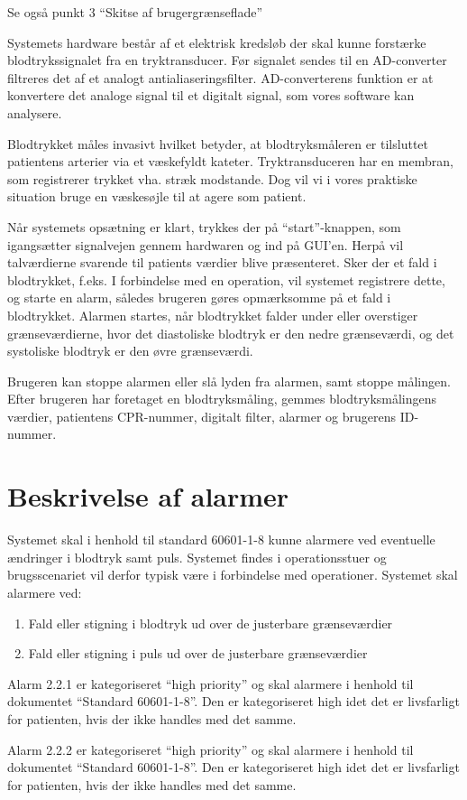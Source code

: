 \vspace{0.7 cm}
Se også punkt 3 “Skitse af brugergrænseflade”


Systemets hardware består af et elektrisk kredsløb der skal kunne forstærke blodtrykssignalet fra en tryktransducer. Før signalet sendes til en AD-converter filtreres det af et analogt antialiaseringsfilter. AD-converterens funktion er at konvertere det analoge signal til et digitalt signal, som vores software kan analysere.

Blodtrykket måles invasivt hvilket betyder, at blodtryksmåleren er tilsluttet patientens arterier via et væskefyldt kateter. Tryktransduceren har en membran, som registrerer trykket vha. stræk modstande. Dog vil vi i vores praktiske situation bruge en væskesøjle til at agere som patient. 


Når systemets opsætning er klart, trykkes der på “start”-knappen, som igangsætter signalvejen gennem hardwaren og ind på GUI'en. Herpå vil talværdierne svarende til patients værdier blive præsenteret. Sker der et fald i blodtrykket, f.eks. I forbindelse med en operation, vil systemet registrere dette, og starte en alarm, således brugeren gøres opmærksomme på et fald i blodtrykket. Alarmen startes, når blodtrykket falder under eller overstiger grænseværdierne, hvor det diastoliske blodtryk er den nedre grænseværdi, og det systoliske blodtryk er den øvre grænseværdi.  


Brugeren kan stoppe alarmen eller slå lyden fra alarmen, samt stoppe målingen. Efter brugeren har foretaget en blodtryksmåling, gemmes blodtryksmålingens værdier, patientens CPR-nummer, digitalt filter, alarmer og brugerens ID-nummer.
\vspace{0.9 cm}
\section{Beskrivelse af alarmer}

Systemet skal i henhold til standard 60601-1-8 kunne alarmere ved eventuelle ændringer i blodtryk samt puls. Systemet findes i operationsstuer og brugsscenariet vil derfor typisk være i forbindelse med operationer. Systemet skal alarmere ved:

\begin{enumerate}[2.2.1]
	\item Fald eller stigning i blodtryk ud over de justerbare grænseværdier
	\item Fald eller stigning i puls ud over de justerbare grænseværdier
\end{enumerate}

Alarm 2.2.1 er kategoriseret “high priority” og skal alarmere i henhold til dokumentet “Standard 60601-1-8”. Den er kategoriseret high idet det er livsfarligt for patienten, hvis der ikke handles med det samme.

Alarm 2.2.2 er kategoriseret “high priority” og skal alarmere i henhold til dokumentet “Standard 60601-1-8”. Den er kategoriseret high idet det er livsfarligt for patienten, hvis der ikke handles med det samme.